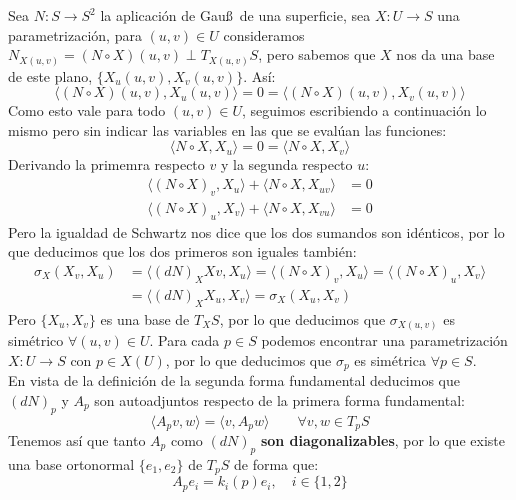 \begin{propiedades}
    Sea $N:S\to S^2$ la aplicación de Gau\ss\ de una superficie, sea $X:U\to S$ una parametrización, para $(u,v)\in U$ consideramos $N_{X(u,v)} = (N\circ X)(u,v)\perp T_{X(u,v)}S$, pero sabemos que $X$ nos da una base de este plano, $\{X_u(u,v),X_v(u,v)\}$. Así:
    \begin{equation*}
        \langle (N\circ X)(u,v),X_u(u,v) \rangle  = 0 = \langle (N\circ X)(u,v),X_v(u,v) \rangle  
    \end{equation*}
    Como esto vale para todo $(u,v)\in U$, seguimos escribiendo a continuación lo mismo pero sin indicar las variables en las que se evalúan las funciones:
    \begin{equation*}
        \langle N\circ X, X_u \rangle  = 0 = \langle N\circ X, X_v \rangle 
    \end{equation*}
    Derivando la primemra respecto $v$ y la segunda respecto $u$:
    \begin{align*}
        \langle (N\circ X)_v,X_u \rangle  + \langle N\circ X,X_{uv} \rangle  &= 0 \\
        \langle (N\circ X)_u,X_v \rangle + \langle N\circ X, X_{vu} \rangle  &= 0
    \end{align*}
    Pero la igualdad de Schwartz nos dice que los dos sumandos son idénticos, por lo que deducimos que los dos primeros son iguales también:
    \begin{align*}
        \sigma_X(X_v,X_u) &= \langle (dN)_XXv,X_u \rangle = \langle (N\circ X)_v,X_u \rangle  = \langle (N\circ X)_u,X_v \rangle \\ &= \langle (dN)_XX_u, X_v \rangle = \sigma_X(X_u,X_v)
    \end{align*}
    Pero $\{X_u,X_v\}$ es una base de $T_XS$, por lo que deducimos que $\sigma_{X(u,v)}$ es simétrico $\forall (u,v)\in U$. Para cada $p\in S$ podemos encontrar una parametrización $X:U\to S$ con $p\in X(U)$, por lo que deducimos que $\sigma_p$ es simétrica $\forall p\in S$.\\

    \noindent
    En vista de la definición de la segunda forma fundamental deducimos que $(dN)_p$ y $A_p$ son autoadjuntos respecto de la primera forma fundamental:
    \begin{equation*}
        \langle A_pv,w \rangle = \langle v,A_pw \rangle  \qquad \forall v,w\in T_pS
    \end{equation*}
    Tenemos así que tanto $A_p$ como $(dN)_p$ \textbf{son diagonalizables}, por lo que existe una base ortonormal $\{e_1,e_2\}$ de $T_pS$ de forma que:
    \begin{equation*}
        A_pe_i = k_i(p)e_i, \quad i \in \{1,2\}
    \end{equation*}
\end{propiedades}

